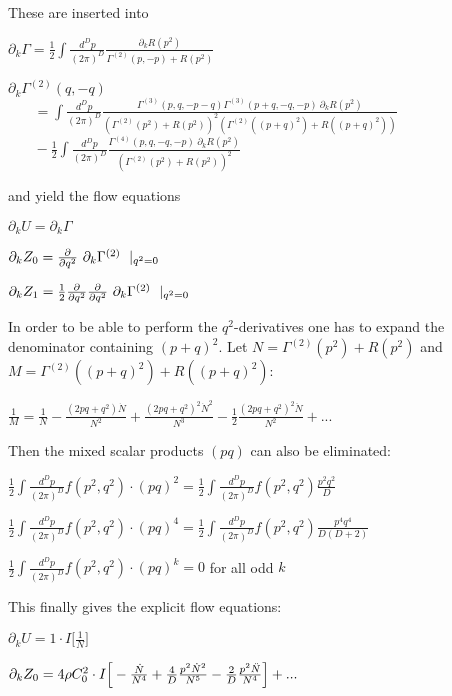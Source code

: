 \documentclass[a4paper,aps,prl,twocolumn,groupedaddress]{revtex4}
\begin{document}
\bigskip
\noindent
These are inserted into

\bigskip $ \partial_k \Gamma = \frac{1}{2} \int \frac{d^Dp}{(2\pi)^D} \frac{\partial_k R(p^2)}{\Gamma^{(2)}(p,-p) + R(p^2)} $

\smallskip $ \partial_k \Gamma^{(2)}(q,-q) $\\
$ ~~~~~~~\; = \int \frac{d^Dp}{(2\pi)^D} \frac{\Gamma^{(3)}(p,q,-p-q)\Gamma^{(3)}(p+q,-q,-p) ~ \partial_k R(p^2)}{(\Gamma^{(2)}(p^2)+R(p^2))^2(\Gamma^{(2)}((p+q)^2)+R((p+q)^2))} $\\
$ ~~~~~~~\; - \frac{1}{2} \int \frac{d^Dp}{(2\pi)^D} \frac{\Gamma^{(4)}(p,q,-q,-p) ~ \partial_k R(p^2)}{(\Gamma^{(2)}(p^2)+R(p^2))^2} $

\bigskip
\noindent
and yield the flow equations

\bigskip $ \partial_k U = \partial_k \Gamma $

\smallskip $ \partial_k Z_0 = \frac{\partial}{\partial q^2} ~ \partial_k \Gamma^{(2)} ~ \mid_{q^2=0} $

\smallskip $ \partial_k Z_1 = \frac{1}{2} \frac{\partial}{\partial q^2} \frac{\partial}{\partial q^2} ~ \partial_k \Gamma^{(2)} ~ \mid_{q^2=0} $

\bigskip
\noindent
In order to be able to perform the $q^2$-derivatives one has to expand the denominator
containing $(p+q)^2$. Let $N=\Gamma^{(2)}(p^2)+R(p^2)$ and $M=\Gamma^{(2)}((p+q)^2)+R((p+q)^2)$:

\bigskip $ \frac{1}{M} = \frac{1}{N} - \frac{(2pq+q^2)\dot{N}}{N^2} + \frac{(2pq+q^2)^2\dot{N}^2}{N^3} - \frac{1}{2}\frac{(2pq+q^2)^2\ddot{N}}{N^2} + ... $

\bigskip
\noindent
Then the mixed scalar products $(pq)$ can also be eliminated:

\bigskip $ \frac{1}{2} \int \frac{d^Dp}{(2\pi)^D} f(p^2,q^2) \cdot (pq)^2 = \frac{1}{2} \int \frac{d^Dp}{(2\pi)^D} f(p^2,q^2) \frac{p^2q^2}{D} $

\smallskip $ \frac{1}{2} \int \frac{d^Dp}{(2\pi)^D} f(p^2,q^2) \cdot (pq)^4 = \frac{1}{2} \int \frac{d^Dp}{(2\pi)^D} f(p^2,q^2) \frac{p^4q^4}{D(D+2)} $

\smallskip $ \frac{1}{2} \int \frac{d^Dp}{(2\pi)^D} f(p^2,q^2) \cdot (pq)^k = 0 $ for all odd $k$

\bigskip
\noindent
This finally gives the explicit flow equations:

\bigskip $ \partial_k U = 1 \cdot I\Big[ \frac{1}{N} \Big] $

\smallskip $ \partial_k Z_0 = 4 \rho C_0^2 \cdot I\Big[ - \frac{\dot{N}}{N^4} + \frac{4}{D} \frac{p^2\dot{N}^2}{N^5} - \frac{2}{D} \frac{p^2\ddot{N}}{N^4} \Big] + ... $
\end{document}
